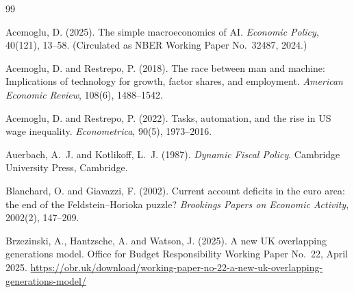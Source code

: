 \begin{thebibliography}{99}

Acemoglu, D. (2025).
\newblock The simple macroeconomics of AI.
\newblock \emph{Economic Policy}, 40(121), 13--58.
\newblock (Circulated as NBER Working Paper No.~32487, 2024.)

Acemoglu, D. and Restrepo, P. (2018).
\newblock The race between man and machine: Implications of technology for growth, factor shares, and employment.
\newblock \emph{American Economic Review}, 108(6), 1488--1542.

Acemoglu, D. and Restrepo, P. (2022).
\newblock Tasks, automation, and the rise in US wage inequality.
\newblock \emph{Econometrica}, 90(5), 1973--2016.

Auerbach, A.~J. and Kotlikoff, L.~J. (1987).
\newblock \emph{Dynamic Fiscal Policy}.
\newblock Cambridge University Press, Cambridge.

Blanchard, O. and Giavazzi, F. (2002).
\newblock Current account deficits in the euro area: the end of the Feldstein--Horioka puzzle?
\newblock \emph{Brookings Papers on Economic Activity}, 2002(2), 147--209.

Brzezinski, A., Hantzsche, A. and Watson, J. (2025).
\newblock A new UK overlapping generations model.
\newblock Office for Budget Responsibility Working Paper No.~22, April 2025.
\newblock \url{https://obr.uk/download/working-paper-no-22-a-new-uk-overlapping-generations-model/}


\end{thebibliography}
